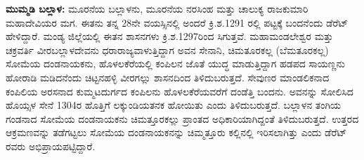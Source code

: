 \textbf{ಮುಮ್ಮಡಿ ಬಲ್ಲಾಳ: } ಮೂರನೆಯ ಬಲ್ಲಾಳನು, ಮೂರನೆಯ ನರಸಿಂಹ ಮತ್ತು ಚಾಲುಕ್ಯ ರಾಜಕುಮಾರಿ ಮಹಾದೇವಿಯರ ಮಗ. ಈತನು ತನ್ನ 28ನೇ ವಯಸ್ಸಿನಲ್ಲಿ ಅಂದರೆ ಕ್ರಿ.ಶ.1291 ರಲ್ಲಿ ಪಟ್ಟಕ್ಕೆ ಬಂದನೆಂದು ಡೆರೆಟ್​ ಹೇಳಿದ್ದಾರೆ. ಮಂಡ್ಯ ಜಿಲ್ಲೆಯಲ್ಲಿ ಈತನ ಶಾಸನಗಳು ಕ್ರಿ.ಶ.1297ರಿಂದ ಸಿಗುತ್ತವೆ. ಮಹಾಮಂಡಲೇಶ್ವರ ಮತ್ತು ಚಕ್ರವರ್ತಿ ವೀರಬಲ್ಲಾಳದೇವನು ಧರಾರಾಜ್ಯವಾಳುತ್ತಿದ್ದಾಗ ಅವನ ಸೇನಾನಿ, ಚಿಮತೂರಕಲ್ಲ (ಬೆಮತೂರಕಲ್ಲ) ಸೋಮೆಯ ದಂಡನಾಯಕನು, ಹೊಳಲಕೆರೆಯಲ್ಲಿ ಕಂಪಿಲನ ಜೊತೆ ಯುದ್ಧ ಮಾಡುತ್ತಿದ್ದಾಗ ಹಡಪದ ಸಾಯಣ್ಣನು ಹೋರಾಡಿ ಮಡಿದನೆಂದು ಚಿಟ್ಟನಹಳ್ಳಿ ವೀರಗಲ್ಲು ಶಾಸನದಿಂದ ತಿಳಿದುಬರುತ್ತದೆ. ಸೇವುಣರ ಮಾಂಡಲಿಕನಾದ ಕಂಪಿಲಿಯ ಅರಸನಾದ ಕುಮ್ಮಟ\-ದುರ್ಗದ ಕಂಪಿಲನು ಹೊಳಲಕೆರೆಯವರೆಗೆ ದಂಡೆತ್ತಿ ಬಂದನು. ಅವನನ್ನು ಸೋಲಿಸಿದ ಹೊಯ್ಸಳ ಸೇನೆ 1304ರ ಹೊತ್ತಿಗೆ ಲಕ್ಕುಂಡಿಯತನಕ ಹೋಯಿತು ಎಂದು ತಿಳಿದುಬರುತ್ತದೆ. ಬಲ್ಲಾಳನ ತಂಗಿಯ ಗಂಡನಾದ ಸೋಮೆಯ ದಂಡನಾಯಕನು ಚಿಮತ್ತೂರಕಲ್ಲು ಪ್ರಾಂತದ ಅಧಿಕಾರಿಯಾಗಿದ್ದಂತೆ ತಿಳಿದುಬರುತ್ತದೆ. ಉತ್ತರದ ಆಕ್ರಮಣವನ್ನು ತಡೆಗಟ್ಟಲು ಸೋಮೆಯ ದಂಡನಾಯಕನನ್ನು ಚಿಮ್ಮತ್ತೂರು ಕಲ್ಲಿನಲ್ಲಿ ಇರಿಸಲಾಗಿತ್ತು ಎಂದು ಡೆರೆಟ್​ರವರು ಅಭಿಪ್ರಾಯಪಟ್ಟಿದ್ದಾರೆ.

